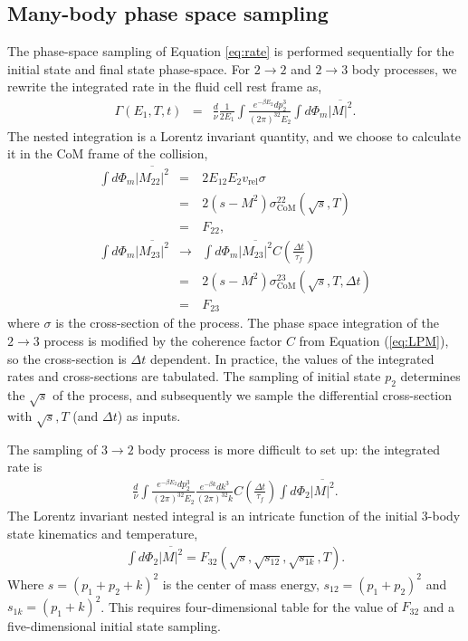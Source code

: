 \documentclass[aps, prc, reprint, amsmath, groupedaddress, nofootinbib]{revtex4-1}
\begin{document}
\begin{appendices}
\section{Many-body phase space sampling}
\label{appendix:sample}
The phase-space sampling of Equation \ref{eq:rate} is performed sequentially for the initial state and final state phase-space.
For $2\rightarrow 2$ and $2\rightarrow 3$ body processes, we rewrite the integrated rate in the fluid cell rest frame as,
\begin{eqnarray}
\Gamma(E_1, T, t) &=& \frac{d}{\nu} \frac{1}{2E_1}\int \frac{e^{-\beta E_2}dp_2^3}{(2\pi)^32E_2} 
\int d\Phi_m\overline{|M|^2}.
\end{eqnarray}
The nested integration is a Lorentz invariant quantity, and we choose to calculate it in the CoM frame of the collision, 
\begin{eqnarray}
\int d\Phi_m\overline{|M_{22}|^2} &=& 2E_12E_2v_{\textrm{rel}}\sigma \nonumber \\
 &=& 2(s-M^2)\sigma_{\textrm{CoM}}^{22}(\sqrt{s}, T)\nonumber \\
  &=& F_{22},\\
\int d\Phi_m\overline{|M_{23}|^2} &\rightarrow& \int d\Phi_m\overline{|M_{23}|^2} C\left(\frac{\Delta t}{\tau_f}\right) \nonumber \\
 &=& 2(s-M^2)\sigma_{\textrm{CoM}}^{23}(\sqrt{s}, T, \Delta t)\nonumber \\
 &=& F_{23}
\end{eqnarray}
where $\sigma$ is the cross-section of the process.
The phase space integration of the $2\rightarrow 3$ process is modified by the coherence factor $C$ from Equation (\ref{eq:LPM}), so the cross-section is $\Delta t$ dependent.
In practice, the values of the integrated rates and cross-sections are tabulated. 
The sampling of initial state $p_2$ determines the $\sqrt{s}$ of the process, and subsequently we sample the differential cross-section with $\sqrt{s}, T$ (and $\Delta t$) as inputs.

The sampling of $3\rightarrow 2$ body process is more difficult to set up:
the integrated rate is
\begin{eqnarray}
\frac{d}{\nu} \int \frac{e^{-\beta E_2}dp_2^3}{(2\pi)^32E_2} \frac{e^{-\beta k}dk^3}{(2\pi)^32k}C\left(\frac{\Delta t}{\tau_f}\right)
\int d\Phi_2\overline{|M|^2}.
\end{eqnarray}
The Lorentz invariant nested integral is an intricate function of the initial 3-body state kinematics and temperature,
\begin{eqnarray}
\int d\Phi_2\overline{|M|^2} = F_{32}(\sqrt{s}, \sqrt{s_{12}}, \sqrt{s_{1k}}, T).
\end{eqnarray}
Where $s = (p_1+p_2+k)^2$ is the center of mass energy, $s_{12} = (p_1+p_2)^2$ and $s_{1k} = (p_1+k)^2$.
This requires four-dimensional table for the value of $F_{32}$ and a five-dimensional initial state sampling.


\end{appendices}
\end{document}
